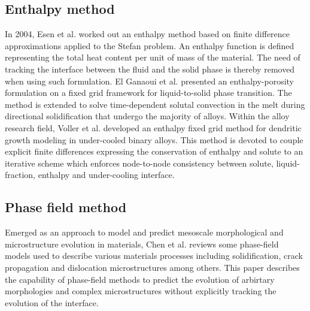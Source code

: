 \subsection{Enthalpy method}
In 2004, Esen et al. \cite{esen_kutluay_2004} worked out an enthalpy method based on finite difference approximations applied to the Stefan problem. An enthalpy function is defined representing the total heat content per unit of mass of the material. The need of tracking the interface between the fluid and the solid phase is thereby removed when using such formulation. El Ganaoui et al. \cite{el_ganaoui_lamazouade_bontoux_morvan_2002} presented an enthalpy-porosity formulation on a fixed grid framework for liquid-to-solid phase transition. The method is extended to solve time-dependent solutal convection in the melt during directional solidification that undergo the majority of alloys. Within the alloy research field, Voller et al. \cite{voller_2008} developed an enthalpy fixed grid method for dendritic growth modeling in under-cooled binary alloys. This method is devoted to couple explicit finite differences expressing the conservation of enthalpy and solute to an iterative scheme which enforces node-to-node consistency between solute, liquid-fraction, enthalpy and under-cooling interface.
\subsection{Phase field method}
Emerged as an approach to model and predict mesoscale morphological and microstructure evolution in materials, Chen et al. \cite{chen_2002} reviews some phase-field models used to describe various materials processes including solidification, crack propagation and dislocation microstructures among others. This paper describes the capability of phase-field methods to predict the evolution of arbirtary morphologies and complex microstructures without explicitly tracking the evolution of the interface.
